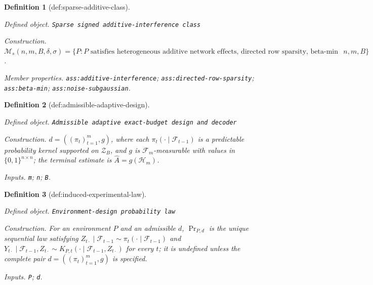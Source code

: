 \documentclass{article}
\newtheorem{definition}{Definition}
\begin{document}
\begin{definition}[def:sparse-additive-class]\label{def:sparse-additive-class}
\par\smallskip\noindent\emph{Defined object.} \texttt{Sparse signed additive-\allowbreak{}interference class}
\par\smallskip\noindent\emph{Construction.} \(\mathcal M_s(n,m,B,\delta,\sigma)=\{P:P\text{ satisfies heterogeneous additive network effects, directed row sparsity, beta-min separation, and the rowwise scalar predictable-design conditionally sub-Gaussian martingale-innovation condition for the displayed indices }n,m,B\}\).
\par\smallskip\noindent\emph{Member properties.} \texttt{ass:\allowbreak{}additive-\allowbreak{}interference}; \texttt{ass:\allowbreak{}directed-\allowbreak{}row-\allowbreak{}sparsity}; \texttt{ass:\allowbreak{}beta-\allowbreak{}min}; \texttt{ass:\allowbreak{}noise-\allowbreak{}subgaussian}.
\end{definition}

\begin{definition}[def:admissible-adaptive-design]\label{def:admissible-adaptive-design}
\par\smallskip\noindent\emph{Defined object.} \texttt{Admissible adaptive exact-\allowbreak{}budget design and decoder}
\par\smallskip\noindent\emph{Construction.} \(d=((\pi_t)_{t=1}^m,g)\), where each \(\pi_t(\cdot\mid\mathcal F_{t-1})\) is a predictable probability kernel supported on \(\mathcal Z_B\), and \(g\) is \(\mathcal F_m\)-measurable with values in \(\{0,1\}^{n\times n}\); the terminal estimate is \(\widehat A=g(\mathscr H_m)\).
\par\smallskip\noindent\emph{Inputs.} \texttt{m}; \texttt{n}; \texttt{B}.
\end{definition}

\begin{definition}[def:induced-experimental-law]\label{def:induced-experimental-law}
\par\smallskip\noindent\emph{Defined object.} \texttt{Environment-\allowbreak{}design probability law}
\par\smallskip\noindent\emph{Construction.} For an environment \(P\) and an admissible \(d\), \(\Pr_{P,d}\) is the unique sequential law satisfying \(Z_{t\cdot}\mid\mathcal F_{t-1}\sim\pi_t(\cdot\mid\mathcal F_{t-1})\) and \(Y_{t\cdot}\mid\mathcal F_{t-1},Z_{t\cdot}\sim K_{P,t}(\cdot\mid\mathcal F_{t-1},Z_{t\cdot})\) for every \(t\); it is undefined unless the complete pair \(d=((\pi_t)_{t=1}^m,g)\) is specified.
\par\smallskip\noindent\emph{Inputs.} \texttt{P}; \texttt{d}.
\end{definition}
\end{document}
